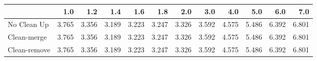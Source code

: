 \begin{tabular}{lrrrrrrrrrrr}
\toprule
{} &   1.0 &   1.2 &   1.4 &   1.6 &   1.8 &   2.0 &   3.0 &   4.0 &   5.0 &   6.0 &   7.0 \\
\midrule
No Clean Up  & 3.765 & 3.356 & 3.189 & 3.223 & 3.247 & 3.326 & 3.592 & 4.575 & 5.486 & 6.392 & 6.801 \\
Clean-merge  & 3.765 & 3.356 & 3.189 & 3.223 & 3.247 & 3.326 & 3.592 & 4.575 & 5.486 & 6.392 & 6.801 \\
Clean-remove & 3.765 & 3.356 & 3.189 & 3.223 & 3.247 & 3.326 & 3.592 & 4.575 & 5.486 & 6.392 & 6.801 \\
\bottomrule
\end{tabular}
